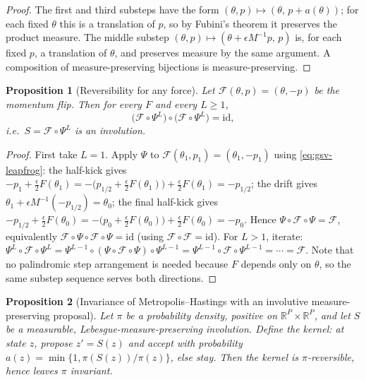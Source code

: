 \documentclass[11pt]{article}
\newtheorem{proposition}{Proposition}[section]
\theoremstyle{definition}
\theoremstyle{remark}
\begin{document}
\begin{proof}
The first and third substeps have the form
$(\theta,p)\mapsto(\theta,\,p+a(\theta))$; for each fixed $\theta$ this is a
translation of $p$, so by Fubini's theorem it preserves the product measure.
The middle substep $(\theta,p)\mapsto(\theta+\epsilon M^{-1}p,\,p)$ is, for
each fixed $p$, a translation of $\theta$, and preserves measure by the same
argument.  A composition of measure-preserving bijections is
measure-preserving.
\end{proof}

\begin{proposition}[Reversibility for any force]
\label{prop:gsv-leapfrog-reversible}
Let $\mathcal F(\theta,p)=(\theta,-p)$ be the momentum flip.  Then for every
$F$ and every $L\ge1$,
\begin{equation}
\label{eq:gsv-involution}
 \big(\mathcal F\circ\Psi^{L}\big)\circ\big(\mathcal F\circ\Psi^{L}\big)
 =\mathrm{id},
\end{equation}
i.e.\ $S=\mathcal F\circ\Psi^{L}$ is an involution.
\end{proposition}

\begin{proof}
First take $L=1$.  Apply $\Psi$ to $\mathcal F(\theta_1,p_1)=(\theta_1,-p_1)$
using \eqref{eq:gsv-leapfrog}: the half-kick gives
$-p_1+\tfrac{\epsilon}{2}F(\theta_1)
=-\big(p_{1/2}+\tfrac{\epsilon}{2}F(\theta_1)\big)
 +\tfrac{\epsilon}{2}F(\theta_1)=-p_{1/2}$;
the drift gives
$\theta_1+\epsilon M^{-1}(-p_{1/2})=\theta_0$;
the final half-kick gives
$-p_{1/2}+\tfrac{\epsilon}{2}F(\theta_0)
=-\big(p_0+\tfrac{\epsilon}{2}F(\theta_0)\big)
 +\tfrac{\epsilon}{2}F(\theta_0)=-p_0$.
Hence $\Psi\circ\mathcal F\circ\Psi=\mathcal F$, equivalently
$\mathcal F\circ\Psi\circ\mathcal F\circ\Psi=\mathrm{id}$ (using
$\mathcal F\circ\mathcal F=\mathrm{id}$).  For $L>1$, iterate:
$\Psi^{L}\circ\mathcal F\circ\Psi^{L}
=\Psi^{L-1}\circ(\Psi\circ\mathcal F\circ\Psi)\circ\Psi^{L-1}
=\Psi^{L-1}\circ\mathcal F\circ\Psi^{L-1}=\cdots=\mathcal F$.
Note that no palindromic step arrangement is needed because $F$ depends only
on $\theta$, so the same substep sequence serves both directions.
\end{proof}

\begin{proposition}[Invariance of Metropolis--Hastings with an involutive
measure-preserving proposal]
\label{prop:gsv-mh-invariance}
Let $\pi$ be a probability density, positive on
$\mathbb{R}^{P}\times\mathbb{R}^{P}$, and let $S$ be a measurable,
Lebesgue-measure-preserving involution.  Define the kernel: at state $z$,
propose $z'=S(z)$ and accept with probability
$a(z)=\min\{1,\pi(S(z))/\pi(z)\}$, else stay.  Then the kernel is
$\pi$-reversible, hence leaves $\pi$ invariant.
\end{proposition}
\end{document}
